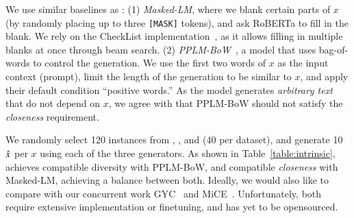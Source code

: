 We use similar baselines as \citet{madaan2020generate}: 
(1) \emph{Masked-LM}, where we blank certain parts of $x$ (by randomly placing up to three \texttt{[MASK]} tokens), and ask RoBERTa to fill in the blank.
We rely on the CheckList implementation~\cite{checklist:acl20}, as it allows filling in multiple blanks at once through beam search. 
(2) \emph{PPLM-BoW}~\cite{Dathathri2020Plug}, a model that uses bag-of-words to control the generation.
We use the first two words of $x$ as the input context (prompt), limit the length of the generation to be similar to $x$, and apply their default condition ``positive words.''
As the model generates \emph{arbitrary text} that do not depend on $x$, we agree with \citet{madaan2020generate} that PPLM-BoW should not satisfy the \emph{closeness} requirement.

We randomly select 120 instances from \qqp, \dnli, and \dsst (40 per dataset), and generate 10 $\hat{x}$ per $x$ using each of the three generators.
As shown in Table~\ref{table:intrinsic}, \sysname achieves compatible diversity with PPLM-BoW, and compatible \emph{closeness} with Masked-LM, achieving a balance between both.
Ideally, we would also like to compare \sysname with our concurrent work GYC~\cite{madaan2020generate} and MiCE~\cite{ross2020explaining}.
Unfortunately, both require extensive implementation or finetuning, and has yet to be opensourced.



